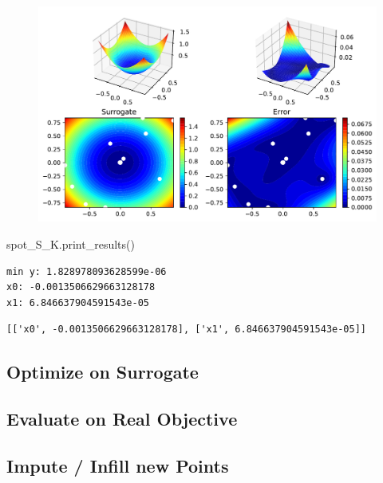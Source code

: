 \documentclass[
  letterpaper,
  DIV=11,
  numbers=noendperiod]{scrreprt}
\newenvironment{Shaded}{\begin{snugshade}}{\end{snugshade}}
\newcommand{\NormalTok}[1]{\textcolor[rgb]{0.00,0.23,0.31}{#1}}
\begin{document}
\begin{figure}[H]

{\centering \includegraphics{012_num_spot_ei_files/figure-pdf/cell-41-output-1.pdf}

}

\end{figure}

\begin{Shaded}
\begin{Highlighting}[]
\NormalTok{spot\_S\_K.print\_results()}
\end{Highlighting}
\end{Shaded}

\begin{verbatim}
min y: 1.828978093628599e-06
x0: -0.0013506629663128178
x1: 6.846637904591543e-05
\end{verbatim}

\begin{verbatim}
[['x0', -0.0013506629663128178], ['x1', 6.846637904591543e-05]]
\end{verbatim}

\hypertarget{optimize-on-surrogate}{%
\subsection{Optimize on Surrogate}\label{optimize-on-surrogate}}

\hypertarget{evaluate-on-real-objective}{%
\subsection{Evaluate on Real
Objective}\label{evaluate-on-real-objective}}

\hypertarget{impute-infill-new-points}{%
\subsection{Impute / Infill new Points}\label{impute-infill-new-points}}
\end{document}
